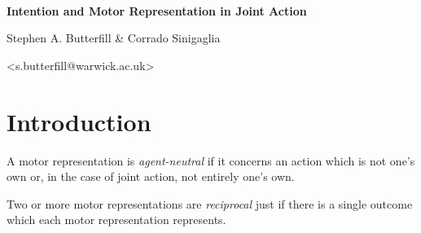 \documentclass[11pt]{extarticle}
\date{}
\begin{document}
\begin{multicols}{3}

\setlength\footnotesep{1em}






\

\begin{center}
{\Large
\textbf{Intention and Motor Representation in Joint Action}
}


Stephen A. Butterfill \& Corrado Sinigaglia

<s.butterfill@warwick.ac.uk>

\end{center}
%
%
%

\section{Introduction}
A motor representation is \emph{agent-neutral} if it concerns an action which is not one’s own or, in the case of joint action, not entirely one’s own.

Two or more motor representations are \emph{reciprocal} just if there is a single outcome which each motor representation represents.


\end{multicols}
\end{document}
